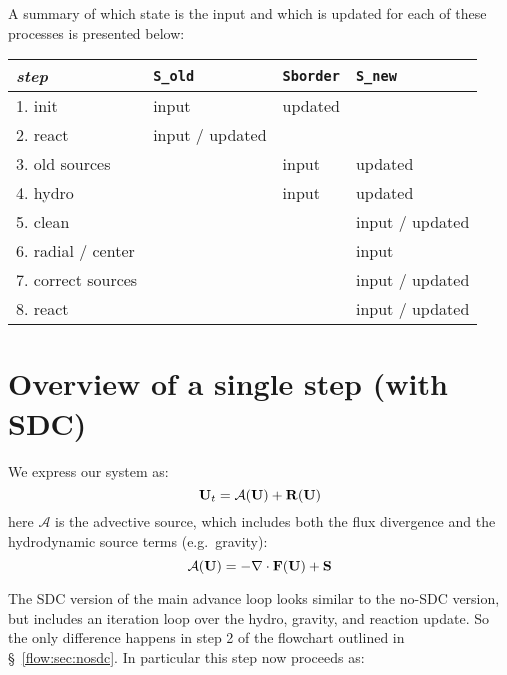 A summary of which state is the input and which is updated for each of
these processes is presented below:
\begin{center}
\renewcommand{\arraystretch}{1.5}
\begin{tabular}{l|lll}
{\em step} & {\tt S\_old} & {\tt Sborder} & {\tt S\_new} \\
\hline
1. init    &   input      &   updated \\
2. react   &                  input / updated \\
3. old sources &          &   input    & updated \\
4. hydro   &              & input      & updated \\
5. clean   &              &            & input / updated \\
6. radial / center  &     &            & input \\
7. correct sources &      &            & input / updated \\
8. react   &              &            & input / updated
\end{tabular}
\end{center}


\section{Overview of a single step (with SDC)}

We express our system as:
\begin{equation}
{\bf U}_t = \mathcal{A}({\bf U}) + {\bf R}({\bf U})
\end{equation}
here $\mathcal{A}$ is the advective source, which includes both the 
flux divergence and the hydrodynamic source terms (e.g.\ gravity):
\begin{equation}
\mathcal{A}({\bf U}) = -\nabla \cdot {\bf F}({\bf U}) + {\bf S}
\end{equation}

The SDC version of the main advance loop looks similar to the no-SDC
version, but includes an iteration loop over the hydro, gravity, and
reaction update.  So the only difference happens in step 2 of the
flowchart outlined in \S~\ref{flow:sec:nosdc}.  In particular this
step now proceeds as:

